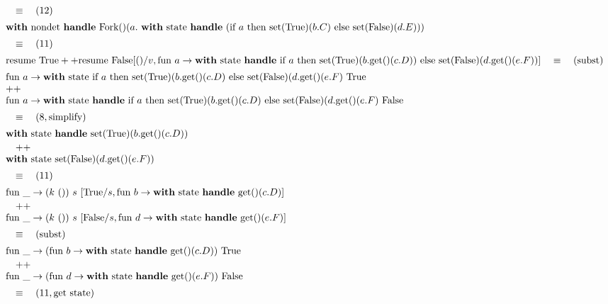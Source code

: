 \documentclass[logo,bsc,singlespacing,parskip]{infthesis}
\begin{document}
\[ 
\begin{array}{l}

\quad\equiv\quad (12) \\[5pt]
\text{\textbf{with} nondet \textbf{handle}}\ \text{Fork()}(a.\ \text{\textbf{with} state \textbf{handle} } (\text{if } a \text{ then set(True)}(b.C) \text{ else set(False)}(d.E))) \\[5pt]
\quad\equiv\quad (11) \\[5pt]
\text{resume True} ++ \text{resume False} 
 [()/v, \text{fun } a \rightarrow \text{\textbf{with} state \textbf{handle} if } a \text{ then set(True)}(b.\text{get()}(c.D)) \text{ else set(False)}(d.\text{get()}(e.F))]
\quad\equiv\quad (\text{subst}) \\[5pt]
\text{fun } a \rightarrow \text{\textbf{with} state if } a \text{ then set(True)}(b.\text{get()}(c.D) \text{ else set(False)}(d.\text{get()}(e.F)\ \text{True} \\
++ \\
\text{fun } a \rightarrow \text{\textbf{with} state \textbf{handle} if } a \text{ then set(True)}(b.\text{get()}(c.D) \text{ else set(False)}(d.\text{get()}(e.F)\ \text{False} \\[5pt]
\quad\equiv\quad (8, \text{simplify}) \\[5pt]
\text{\textbf{with} state \textbf{handle} set(True)}(b.\text{get()}(c.D)) \\[2pt]
\quad ++ \\  \text{\textbf{with} state set(False)}(d.\text{get()}(e.F)) \\[5pt]
\quad\equiv\quad (11) \\[5pt]
\text{fun } \_ \rightarrow (k\ ())\ s\ [\text{True}/s, \text{fun } b \rightarrow \text{\textbf{with} state \textbf{handle} get()}(c.D)] \\[2pt]
\quad ++ \\ \text{fun } \_ \rightarrow (k\ ())\ s\ [\text{False}/s, \text{fun } d \rightarrow \text{\textbf{with} state \textbf{handle} get()}(e.F)] \\[5pt]
\quad\equiv\quad (\text{subst}) \\[5pt]
\text{fun } \_ \rightarrow (\text{fun } b \rightarrow \text{\textbf{with} state \textbf{handle} get()}(c.D))\ \text{True} \\[2pt]
\quad ++ \\ \text{fun } \_ \rightarrow (\text{fun } d \rightarrow \text{\textbf{with} state \textbf{handle} get()}(e.F))\ \text{False} \\[5pt]
\quad\equiv\quad (11, \text{get state}) \\[5pt]

\end{array}\]
\end{document}
